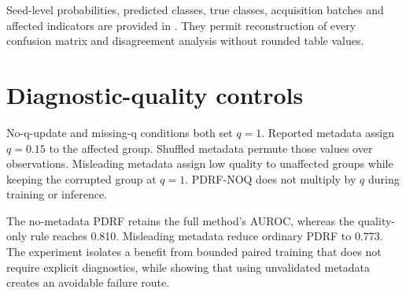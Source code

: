\documentclass[10pt]{article}
\begin{document}
\begin{table}[ht]
\centering
\caption{Chemical-array affected, unaffected and mixed-set performance under the fixed silent fault. Values are means across 10 seeds.}
\resizebox{0.88\textwidth}{!}{}
\end{table}

\begin{table}[ht]
\centering
\caption{Results reported separately for acquisition batches 8, 9 and 10. Values are means across 10 seeds.}
\resizebox{0.72\textwidth}{!}{}
\end{table}

\begin{table}[p]
\centering
\caption{Per-class chemical-array performance under the fixed silent fault. Values are means across 10 seeds. Classes correspond to the six gases in the repository encoding.}
\resizebox{0.76\textwidth}{!}{}
\end{table}

Seed-level probabilities, predicted classes, true classes, acquisition batches and affected indicators are provided in . They permit reconstruction of every confusion matrix and disagreement analysis without rounded table values.

\section{Diagnostic-quality controls}

No-q-update and missing-q conditions both set $q=1$. Reported metadata assign $q=0.15$ to the affected group. Shuffled metadata permute those values over observations. Misleading metadata assign low quality to unaffected groups while keeping the corrupted group at $q=1$. PDRF-NOQ does not multiply by $q$ during training or inference.

\begin{table}[ht]
\centering
\caption{Diagnostic-quality controls under the fixed chemical-array fault.}
\resizebox{0.66\textwidth}{!}{}
\end{table}

The no-metadata PDRF retains the full method's AUROC, whereas the quality-only rule reaches 0.810. Misleading metadata reduce ordinary PDRF to 0.773. The experiment isolates a benefit from bounded paired training that does not require explicit diagnostics, while showing that using unvalidated metadata creates an avoidable failure route.
\end{document}
